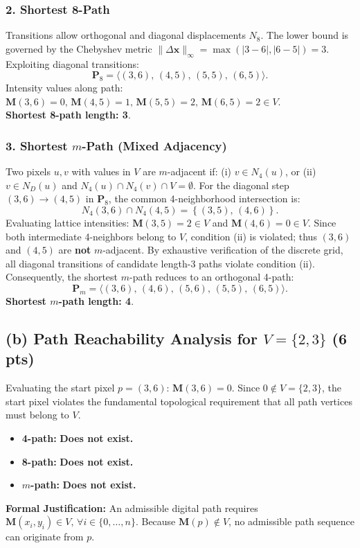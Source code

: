 \documentclass[11pt,a4paper]{article}
\begin{document}
\subsubsection{2. Shortest 8-Path}
Transitions allow orthogonal and diagonal displacements $N_8$. The lower bound is governed by the Chebyshev metric $\|\Delta \mathbf{x}\|_\infty = \max(|3 - 6|, |6 - 5|) = 3$. Exploiting diagonal transitions:
\begin{equation}
\mathbf{P}_8 = \langle (3, 6), \, (4, 5), \, (5, 5), \, (6, 5) \rangle.
\end{equation}
\noindent Intensity values along path: $\mathbf{M}(3, 6)=0, \, \mathbf{M}(4, 5)=1, \, \mathbf{M}(5, 5)=2, \, \mathbf{M}(6, 5)=2 \in V$. \\
\textbf{Shortest 8-path length: 3}.

\subsubsection{3. Shortest \texorpdfstring{$m$}{m}-Path (Mixed Adjacency)}
Two pixels $u, v$ with values in $V$ are $m$-adjacent if: (i) $v \in N_4(u)$, or (ii) $v \in N_D(u)$ and $N_4(u) \cap N_4(v) \cap V = \emptyset$.
For the diagonal step $(3, 6) \to (4, 5)$ in $\mathbf{P}_8$, the common 4-neighborhood intersection is:
\begin{equation}
N_4(3, 6) \cap N_4(4, 5) = \left\{ (3, 5), \, (4, 6) \right\}.
\end{equation}
Evaluating lattice intensities: $\mathbf{M}(3, 5) = 2 \in V$ and $\mathbf{M}(4, 6) = 0 \in V$. Since both intermediate 4-neighbors belong to $V$, condition (ii) is violated; thus $(3, 6)$ and $(4, 5)$ are \textbf{not} $m$-adjacent. By exhaustive verification of the discrete grid, all diagonal transitions of candidate length-3 paths violate condition (ii). Consequently, the shortest $m$-path reduces to an orthogonal 4-path:
\begin{equation}
\mathbf{P}_m = \langle (3, 6), \, (4, 6), \, (5, 6), \, (5, 5), \, (6, 5) \rangle.
\end{equation}
\textbf{Shortest $m$-path length: 4}.

\subsection{(b) Path Reachability Analysis for \texorpdfstring{$V = \{2, 3\}$}{V = {2, 3}} (6 pts)}
Evaluating the start pixel $p = (3, 6)$: $\mathbf{M}(3, 6) = 0$. Since $0 \notin V = \{2, 3\}$, the start pixel violates the fundamental topological requirement that all path vertices must belong to $V$.
\begin{itemize}
    \item \textbf{4-path:} \textbf{Does not exist.}
    \item \textbf{8-path:} \textbf{Does not exist.}
    \item \textbf{$m$-path:} \textbf{Does not exist.}
\end{itemize}
\noindent\textbf{Formal Justification:} An admissible digital path requires $\mathbf{M}(x_i, y_i) \in V, \, \forall i \in \{0, \dots, n\}$. Because $\mathbf{M}(p) \notin V$, no admissible path sequence can originate from $p$.
\end{document}
